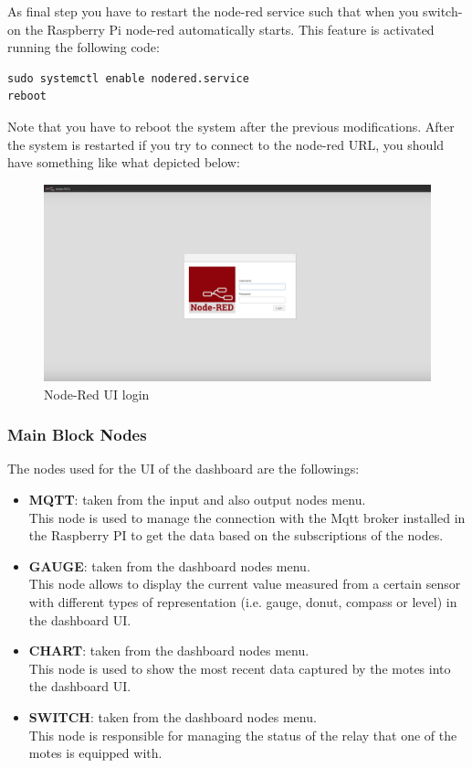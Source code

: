 \noindent
As final step you have to restart the node-red service such that when you switch-on the Raspberry Pi node-red automatically starts.
\newline
This feature is activated running the following code:
\begin{verbatim}
sudo systemctl enable nodered.service
reboot
\end{verbatim}
Note that you have to reboot the system after the previous modifications.
\newline
\newline
After the system is restarted if you try to connect to the node-red URL, you should have something like what depicted below: 

\begin{figure}[H]
	\begin{center}
		\includegraphics[width=1.0\textwidth]{./pictures/node-red-UI-login}
		\caption{Node-Red UI login}
		\label{mqtt_functioning}
	\end{center}
\end{figure}



\subsubsection{Main Block Nodes}
The nodes used for the UI of the dashboard are the followings:
\begin{itemize}
    \item \textbf{MQTT}: taken from the input and also output nodes menu.\\
    This node is used to manage the connection with the Mqtt broker installed in the Raspberry PI to get the data based on the subscriptions of the nodes.
    \item \textbf{GAUGE}: taken from the dashboard nodes menu.\\
    This node allows to display the current value measured from a certain sensor with different types of representation (i.e. gauge, donut, compass or level) in the dashboard UI.
    \item \textbf{CHART}: taken from the dashboard nodes menu.\\
    This node is used to show the most recent data captured by the motes into the dashboard UI.
    \item \textbf{SWITCH}: taken from the dashboard nodes menu.\\
    This node is responsible for managing the status of the relay that one of the motes is equipped with.
\end{itemize}

